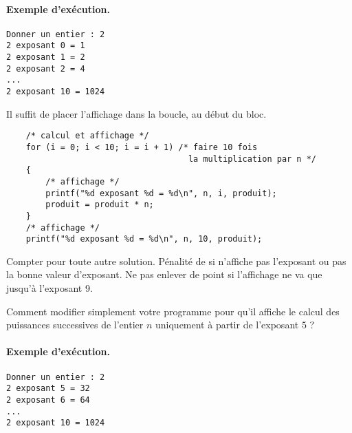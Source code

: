 \paragraph{Exemple d'exécution.} 
\begin{small}
\begin{verbatim}
Donner un entier : 2
2 exposant 0 = 1
2 exposant 1 = 2
2 exposant 2 = 4
...
2 exposant 10 = 1024
\end{verbatim}
\end{small}
\begin{correction}
  Il suffit de placer l'affichage dans la boucle, au début du bloc.
\begin{small}
\begin{verbatim}
    /* calcul et affichage */
    for (i = 0; i < 10; i = i + 1) /* faire 10 fois 
                                     la multiplication par n */
    {
        /* affichage */
        printf("%d exposant %d = %d\n", n, i, produit);
        produit = produit * n;
    }
    /* affichage */
    printf("%d exposant %d = %d\n", n, 10, produit);
\end{verbatim}
\end{small}
  \begin{baremeenv}
    Compter  pour toute autre solution. Pénalité de  si
    n'affiche pas l'exposant ou pas la bonne valeur
    d'exposant. Ne pas enlever de point si l'affichage ne va que
    jusqu'à l'exposant 9.
  \end{baremeenv}
\end{correction}


\question Comment modifier simplement votre programme pour qu'il
affiche le calcul des puissances successives de l'entier $n$
uniquement à partir de l'exposant $5$ ?

\paragraph{Exemple d'exécution.} 
\begin{small}
\begin{verbatim}
Donner un entier : 2
2 exposant 5 = 32
2 exposant 6 = 64
...
2 exposant 10 = 1024
\end{verbatim}
\end{small}

